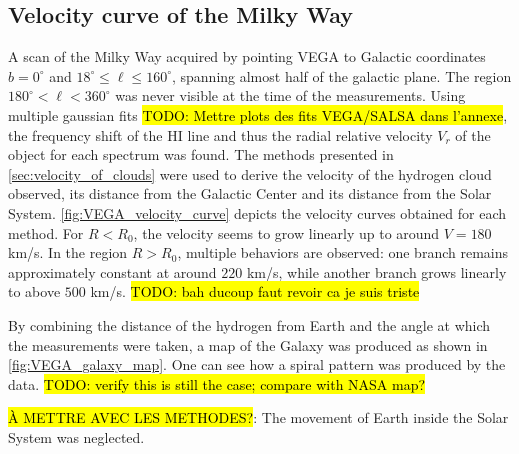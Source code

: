 \subsection{Velocity curve of the Milky Way}
A scan of the Milky Way acquired by pointing VEGA to Galactic coordinates $b = 0^\circ$ and $18^\circ \leq \ell \leq 160^\circ$, spanning almost half of the galactic plane. The region $180^\circ < \ell < 360^\circ$ was never visible at the time of the measurements.
Using multiple gaussian fits \hl{TODO: Mettre plots des fits VEGA/SALSA dans l'annexe}, the frequency shift of the HI line and thus the radial relative velocity $V_r$ of the object for each spectrum was found. The methods presented in \autoref{sec:velocity_of_clouds} were used to derive the velocity of the hydrogen cloud observed, its distance from the Galactic Center and its distance from the Solar System.
\autoref{fig:VEGA_velocity_curve} depicts the velocity curves obtained for each method. For $R < R_0$, the velocity seems to grow linearly up to around $V=180$ km/s. In the region $R > R_0$, multiple behaviors are observed: one branch remains approximately constant at around $220$ km/s, while another branch grows linearly to above $500$ km/s. \hl{TODO: bah ducoup faut revoir ca je suis triste}

By combining the distance of the hydrogen from Earth and the angle at which the measurements were taken, a map of the Galaxy was produced as shown in \autoref{fig:VEGA_galaxy_map}. One can see how a spiral pattern was produced by the data. \hl{TODO: verify this is still the case; compare with NASA map?}

\hl{À METTRE AVEC LES METHODES?}: The movement of Earth inside the Solar System was neglected.

